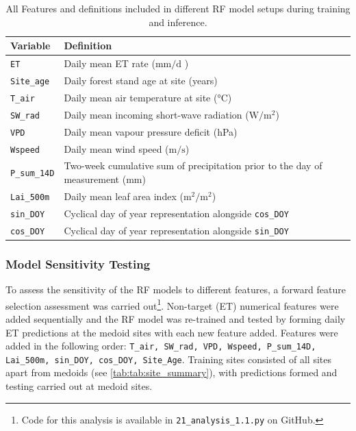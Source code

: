 \begin{table}[H]
	\caption{\centering All Features and definitions included in different \ac{RF} model setups during training and inference.}
	\centering
	\begin{tabularx}{\linewidth}{lX}
		\toprule
		Variable & Definition \\
		\midrule
		\texttt{\ac{ET}} &  Daily mean \ac{ET} rate ($\si{\milli\metre\per\day}$ )\\
		\texttt{Site\_age} &  Daily forest stand age at site (years) \\
		\texttt{T\_air} &  Daily mean air temperature at site (\si{\degreeCelsius}) \\
		\texttt{SW\_rad} & Daily mean incoming short-wave radiation ($\si{\watt\per\metre\squared}$) \\
		\texttt{VPD} &  Daily mean vapour pressure deficit (\si{\hecto\pascal}) \\
		\texttt{Wspeed} & Daily mean wind speed ($\si{\meter\per\second}$) \\
		\texttt{P\_sum\_14D} &  Two-week cumulative sum of precipitation prior to the day of measurement ($\si{\milli\metre}$) \\
		\texttt{Lai\_500m} &  Daily mean leaf area index ($\si{\metre\squared\per\metre\squared}$) \\
		\texttt{sin\_DOY} & Cyclical day of year representation alongside \texttt{cos\_DOY} \\
		\texttt{cos\_DOY} & Cyclical day of year representation alongside \texttt{sin\_DOY} \\
	\end{tabularx}
	\label{tab:features}
\end{table}



\subsubsection{Model Sensitivity Testing} \label{sec:sens}
To assess the sensitivity of the \ac{RF} models to different features, a forward feature selection assessment was carried out\footnote{Code for this analysis is available in \texttt{21\_analysis\_1.1.py} on GitHub.}. Non-target (\ac{ET}) numerical features were added sequentially and the \ac{RF} model was re-trained and tested by forming daily \ac{ET} predictions at the medoid sites with each new feature added. Features were added in the following order: \texttt{T\_air, SW\_rad, VPD, Wspeed, P\_sum\_14D, Lai\_500m, sin\_DOY, cos\_DOY, Site\_Age}. Training sites consisted of all sites apart from medoids (see \autoref{tab:tab:site_summary}), with predictions formed and testing carried out at medoid sites.


